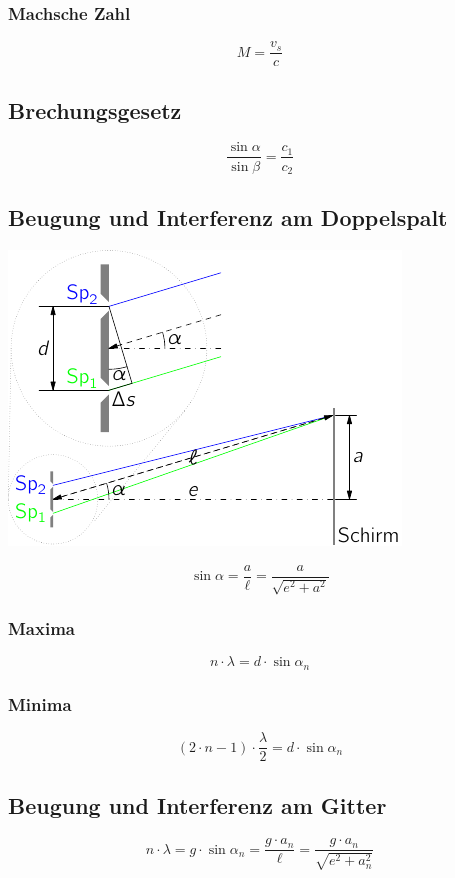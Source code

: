 \subsubsection{Machsche Zahl}
\begin{equation}\label{eq:machsche:zahl}
M = \frac{v_s}{c}
\end{equation}

\subsection{Brechungsgesetz}
\begin{equation}\label{eq:brechungsgestz}
\frac{\sin\alpha}{\sin\beta} = \frac{c_1}{c_2}
\end{equation}

\subsection{Beugung und Interferenz am Doppelspalt}
\begin{center}
\includegraphics{doppelspalt}
\end{center}
\begin{equation}\label{eq:beugung:doppelspalt}
\sin\alpha = \frac{a}{\ell} = \frac{a}{\sqrt{e^2 + a^2}}
\end{equation}

\subsubsection{Maxima}
\begin{equation}\label{eq:interferenz:doppelspalt:maxima}
n\cdot \lambda = d \cdot \sin \alpha_n
\end{equation}

\subsubsection{Minima}
\begin{equation}\label{eq:interferenz:doppelspalt:minima}
(2\cdot n - 1) \cdot \frac{\lambda}{2} = d \cdot \sin \alpha_n
\end{equation}

\subsection{Beugung und Interferenz am Gitter}
\begin{equation}\label{eq:beugung:gitter}
n \cdot \lambda = g \cdot \sin\alpha_n = \frac{g \cdot a_n}{\ell} =
\frac{g \cdot a_n}{\sqrt{e^2 + a_n^2}}
\end{equation}
